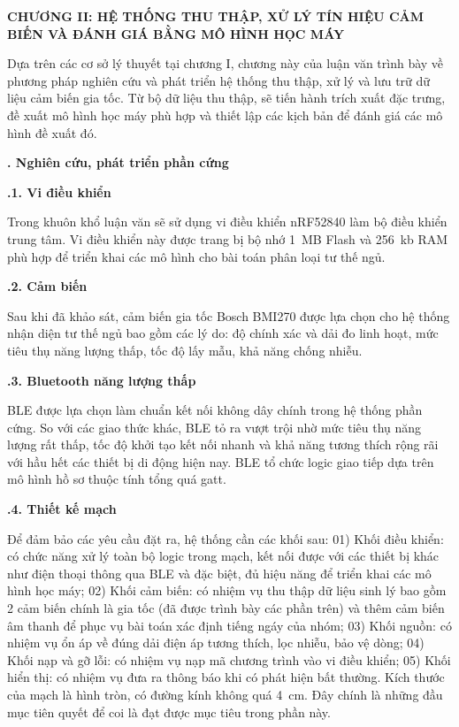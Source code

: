 \begin{center}
    \textbf{\fontsize{20}{22}\selectfont CHƯƠNG II: HỆ THỐNG THU THẬP, XỬ LÝ TÍN HIỆU CẢM BIẾN VÀ
        ĐÁNH GIÁ BẰNG MÔ HÌNH HỌC MÁY}
\end{center}
Dựa trên các cơ sở lý thuyết tại chương I, chương này của luận văn trình bày về
phương pháp nghiên cứu và phát triển hệ thống thu thập, xử lý và lưu trữ dữ
liệu cảm biến gia tốc. Từ bộ dữ liệu thu thập, sẽ tiến hành trích xuất đặc
trưng, đề xuất mô hình học máy phù hợp và thiết lập các kịch bản để đánh giá
các mô hình đề xuất đó.

\noindent\textbf{\fontsize{16}{20}. Nghiên cứu, phát triển phần cứng}

\noindent\textbf{\fontsize{14}{5}.1. Vi điều khiển}

Trong khuôn khổ luận văn sẽ sử dụng vi điều khiển nRF52840 làm bộ điều khiển
trung tâm. Vi điều khiển này được trang bị bộ nhớ 1~MB Flash và 256~kb RAM phù
hợp để triển khai các mô hình cho bài toán phân loại tư thế ngủ.

\noindent\textbf{\fontsize{14}{5}.2. Cảm biến}

Sau khi đã khảo sát, cảm biến gia tốc Bosch BMI270 được lựa chọn cho hệ thống
nhận diện tư thế ngủ bao gồm các lý do: độ chính xác và dải đo linh hoạt, mức
tiêu thụ năng lượng thấp, tốc độ lấy mẫu, khả năng chống nhiễu.

\noindent\textbf{\fontsize{14}{5}.3. Bluetooth năng lượng thấp}

BLE được lựa chọn làm chuẩn kết nối không dây chính trong hệ thống phần cứng.
So với các giao thức khác, BLE tỏ ra vượt trội nhờ mức tiêu thụ năng lượng rất
thấp, tốc độ khởi tạo kết nối nhanh và khả năng tương thích rộng rãi với hầu
hết các thiết bị di động hiện nay. BLE tổ chức logic giao tiếp dựa trên mô hình
hồ sơ thuộc tính tổng quá \gls{gatt}.

\noindent\textbf{\fontsize{14}{5}.4. Thiết kế mạch}

Để đảm bảo các yêu cầu đặt ra, hệ thống cần
các khối sau: 01) Khối điều khiển: có chức năng xử lý toàn bộ logic trong
mạch, kết nối được với các thiết bị khác như điện thoại thông qua BLE và đặc
biệt, đủ hiệu năng để triển khai các mô hình học máy; 02) Khối cảm biến: có
nhiệm vụ thu thập dữ liệu sinh lý bao gồm 2 cảm biến chính là gia tốc (đã được
trình bày các phần trên) và thêm cảm biến âm thanh để phục vụ bài toán xác định
tiếng ngáy của nhóm; 03) Khối nguồn: có nhiệm vụ ổn áp về đúng dải điện áp
tương thích, lọc nhiễu, bảo vệ dòng; 04) Khối nạp và gỡ lỗi: có nhiệm vụ nạp mã
chương trình vào vi điều khiển; 05) Khối hiển thị: có nhiệm vụ đưa ra thông báo
khi có phát hiện bất thường. Kích thước của mạch là hình tròn, có đường kính
không quá 4~cm. Đây chính là những đầu mục tiên quyết để coi là đạt được mục
tiêu trong phần này.

